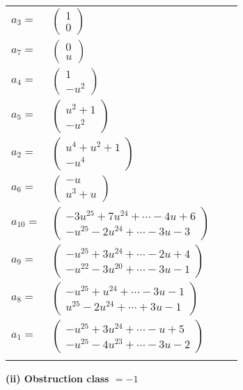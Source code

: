 \documentclass[1p]{elsarticle_modified}
\theoremstyle{definition}
\begin{document}
\begin{tabular}{m{7pt} m{180pt} m{7pt} m{180pt} }
\flushright $a_{3}=$&$\begin{pmatrix}1\\0\end{pmatrix}$ \\
\flushright $a_{7}=$&$\begin{pmatrix}0\\u\end{pmatrix}$ \\
\flushright $a_{4}=$&$\begin{pmatrix}1\\- u^2\end{pmatrix}$ \\
\flushright $a_{5}=$&$\begin{pmatrix}u^2+1\\- u^2\end{pmatrix}$ \\
\flushright $a_{2}=$&$\begin{pmatrix}u^4+u^2+1\\- u^4\end{pmatrix}$ \\
\flushright $a_{6}=$&$\begin{pmatrix}- u\\u^3+u\end{pmatrix}$ \\
\flushright $a_{10}=$&$\begin{pmatrix}-3 u^{25}+7 u^{24}+\cdots-4 u+6\\- u^{25}-2 u^{24}+\cdots-3 u-3\end{pmatrix}$ \\
\flushright $a_{9}=$&$\begin{pmatrix}- u^{25}+3 u^{24}+\cdots-2 u+4\\- u^{22}-3 u^{20}+\cdots-3 u-1\end{pmatrix}$ \\
\flushright $a_{8}=$&$\begin{pmatrix}- u^{25}+u^{24}+\cdots-3 u-1\\u^{25}-2 u^{24}+\cdots+3 u-1\end{pmatrix}$ \\
\flushright $a_{1}=$&$\begin{pmatrix}- u^{25}+3 u^{24}+\cdots- u+5\\- u^{25}-4 u^{23}+\cdots-3 u-2\end{pmatrix}$\\&\end{tabular}
\flushleft \textbf{(ii) Obstruction class $= -1$}\\~\\
\end{document}

